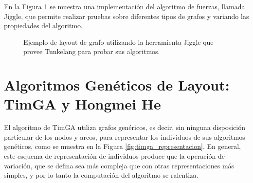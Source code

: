 En la Figura \ref{fig:jiggle} se muestra una implementación del algoritmo de fuerzas, llamada Jiggle, que permite realizar pruebas sobre diferentes tipos de grafos y variando las propiedades del algoritmo.

\begin{figure}[H]
	\centering
	\caption{Ejemplo de layout de grafo utilizando la herramienta Jiggle que provee Tunkelang para probar sus algoritmos.}
	\label{fig:jiggle}
\end{figure}


\section{Algoritmos Genéticos de Layout: TimGA y Hongmei He}
El algoritmo de TimGA \cite{eloranta2001timga} utiliza grafos genéricos, es decir, sin ninguna disposición particular de los nodos y arcos, para representar los individuos de sus algoritmos genéticos, como se muestra en la Figura \ref{fig:timga_representacion}. En general, este esquema de representación de individuos produce que la operación de variación, que se defina sea más compleja que con otras representaciones más simples, y por lo tanto la computación del algoritmo se ralentiza.

